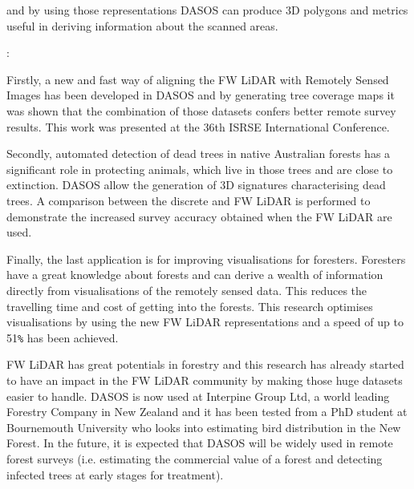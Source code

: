 \documentclass{subfiles}
\begin{document}
 
 
 






\par 

and by using those representations DASOS can produce 3D polygons and metrics useful in deriving information about the scanned areas.

\par :

\par Firstly, a new and fast way of aligning the FW LiDAR with Remotely Sensed Images has been developed in DASOS and by generating tree coverage maps it was shown that the combination of those datasets confers better remote survey results.  This work was presented at the 36th ISRSE International Conference. 

\par Secondly, automated detection of dead trees in native Australian forests has a significant role in protecting animals, which live in those trees and are close to extinction. DASOS allow the generation of 3D signatures characterising dead trees. A comparison between the discrete and FW LiDAR is performed to demonstrate the increased survey accuracy obtained when the FW LiDAR are used. 

\par Finally, the last application is for improving visualisations for foresters. Foresters have a great knowledge about forests and can derive a wealth of information directly from visualisations of the remotely sensed data. This reduces the travelling time and cost of getting into the forests. This research optimises visualisations by using the new FW LiDAR representations and a speed of up to 51\verb|%| has been achieved.

\par FW LiDAR has great potentials in forestry and this research has already started to have an impact in the FW LiDAR community by making those huge datasets easier to handle. DASOS is now used at Interpine Group Ltd, a world leading Forestry Company in New Zealand and it has been tested from a PhD student at Bournemouth University who looks into estimating bird distribution in the New Forest. In the future, it is expected that DASOS will be widely used in remote forest surveys (i.e. estimating the commercial value of a forest and detecting infected trees at early stages for treatment). 
\end{document}
